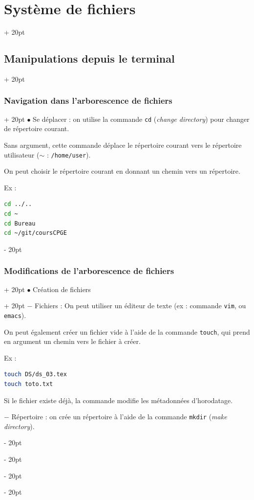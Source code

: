 \documentclass[a4paper, 12pt, twoside]{article}
\renewcommand{\em}{\color{ff4500}}
\newcommand{\ind}[1][20pt]{\advance\leftskip + #1}
\newcommand{\deind}[1][20pt]{\advance\leftskip - #1}
\newenvironment{indentedenv}[1][20pt]{\par \ind[#1]}{\par \deind}
\newenvironment{indt}[2][20pt]{#2 \begin{indentedenv}[#1]}{\end{indentedenv}} %
\begin{document}
\begin{indt}{\section{Système de fichiers}}
\begin{indt}{\subsection{Manipulations depuis le terminal}}
\begin{indt}{\subsubsection{Navigation dans l'arborescence de fichiers}}
                $\bullet$ Se déplacer : on utilise la commande \texttt{\em cd} (\textit{change directory}) pour changer de répertoire courant.
                
                Sans argument, cette commande déplace le répertoire courant vers le répertoire utilisateur (\texttt{$\sim$} : \texttt{/home/user}).
                
                On peut choisir le répertoire courant en donnant un chemin vers un répertoire.
                
                Ex :
                \begin{lstlisting}[language=Bash, xleftmargin=80pt]
cd ../..
cd ~
cd Bureau
cd ~/git/coursCPGE\end{lstlisting}


            \end{indt}
            
            \newpage
            
            \begin{indt}{\subsubsection{Modifications de l'arborescence de fichiers}}
                \begin{indt}{$\bullet$ Création de fichiers}
                    $-$ Fichiers : On peut utiliser un éditeur de texte (ex : commande \texttt{vim}, ou \texttt{emacs}).
                    
                    On peut également créer un fichier vide à l'aide de la commande \texttt{\em touch}, qui prend en argument un chemin vers le fichier à créer.
                    
                    Ex :
                    \begin{lstlisting}[language=Bash, xleftmargin=100pt]
touch DS/ds_03.tex
touch toto.txt\end{lstlisting}
                    
                    Si le fichier existe déjà, la commande modifie les métadonnées d'horodatage.
                    
                    \vspace{12pt}
                    
                    $-$ Répertoire : on crée un répertoire à l'aide de la commande \texttt{\em mkdir} (\textit{make directory}).
                    

\end{indt}
\end{indt}
\end{indt}
\end{indt}
\end{document}
